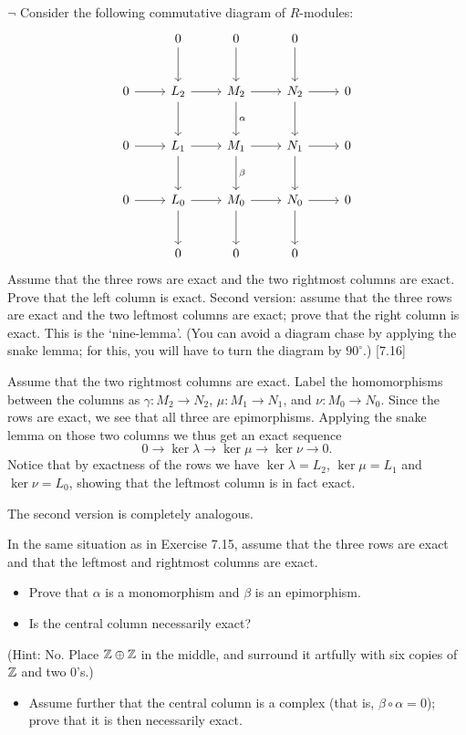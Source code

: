 \begin{problem}
	$\neg$ Consider the following commutative diagram of $R$-modules:
	\[
		\begin{tikzcd}[row sep=large]
			& 0
			\arrow[d]
			& 0
			\arrow[d]
			& 0
			\arrow[d]
			& \\
			0
			\arrow[r]
			& L_2
			\arrow[r]
			\arrow[d]
			& M_2
			\arrow[r]
			\arrow[d, "\alpha"]
			& N_2
			\arrow[r]
			\arrow[d]
			& 0 \\
			0
			\arrow[r]
			& L_1
			\arrow[r]
			\arrow[d]
			& M_1
			\arrow[r]
			\arrow[d, "\beta"]
			& N_1
			\arrow[r]
			\arrow[d]
			& 0 \\
			0
			\arrow[r]
			& L_0
			\arrow[r]
			\arrow[d]
			& M_0
			\arrow[r]
			\arrow[d]
			& N_0
			\arrow[r]
			\arrow[d]
			& 0 \\
			& 0
			& 0
			& 0
		\end{tikzcd}
	\]
	Assume that the three rows are exact and the two rightmost columns are exact. Prove that the left column is exact. Second version: assume that the three rows are exact and the two leftmost columns are exact; prove that the right column is exact. This is the `nine-lemma'. (You can avoid a diagram chase by applying the snake lemma; for this, you will have to turn the diagram by $90^{\circ}$.) [7.16]
\end{problem}

\begin{solution}
	Assume that the two rightmost columns are exact. Label the homomorphisms between the columns as $\gamma: M_2 \to N_2$, $\mu: M_1 \to N_1$, and $\nu: M_0 \to N_0$. Since the rows are exact, we see that all three are epimorphisms. Applying the snake lemma on those two columns we thus get an exact sequence
	\[
		0 \to \ker \lambda \to \ker \mu \to \ker \nu \to 0 \text{.}
	\]
	Notice that by exactness of the rows we have $\ker \lambda = L_2$, $\ker \mu = L_1$ and $\ker \nu = L_0$, showing that the leftmost column is in fact exact.
	
	The second version is completely analogous.
\end{solution}

\begin{problem}
	In the same situation as in Exercise 7.15, assume that the three rows are exact and that the leftmost and rightmost columns are exact.
	\begin{itemize}
		\item Prove that $\alpha$ is a monomorphism and $\beta$ is an epimorphism.
		\item Is the central column necessarily exact?
	\end{itemize}
	(Hint: No. Place $\mathbb{Z} \oplus \mathbb{Z}$ in the middle, and surround it artfully with six copies of $\mathbb{Z}$ and two $0$'s.)
	\begin{itemize}
		\item Assume further that the central column is a complex (that is, $\beta \circ \alpha = 0$); prove that it is then necessarily exact.
	\end{itemize}
\end{problem}

